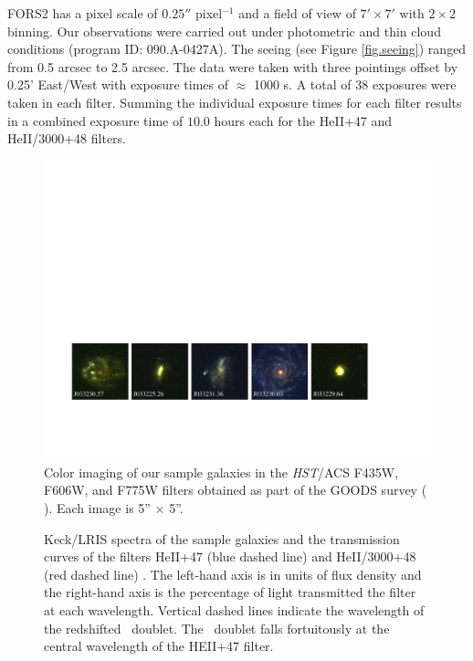 \documentclass[twocolumn]{aastex61}
\begin{document}
FORS2 has a pixel scale of $0.25''$ pixel$^{-1}$ and a field of view of $7'\times7'$ with $2 \times 2$ binning. Our observations were carried out under photometric and thin cloud conditions (program ID: 090.A-0427A). The seeing (see Figure \ref{fig.seeing}) ranged from 0.5 arcsec to 2.5 arcsec. The data were taken with three pointings offset by 0.25' East/West with exposure times of $\approx$ 1000 s. A total of 38  exposures were taken in each filter. Summing the individual exposure times for each filter results in a combined exposure time of $10.0$ hours each for the HeII+47 and HeII/3000+48 filters.

\begin{figure}[!ht]
\centering
\includegraphics[scale=.73]{../Figures/fors2_color_imstamps.pdf}
\caption{Color imaging of our sample galaxies in the \emph{HST}/ACS F435W, F606W, and F775W filters obtained as part of the GOODS survey (\citeauthor{Giavalisco2004} \citeyear{Giavalisco2004}). Each image is 5'' $\times$ 5''.\label{fig:hstims}}
\end{figure}

\begin{figure}[!h]
\centering
{}
\caption{Keck/LRIS spectra of the sample galaxies and the transmission curves of the filters HeII+47 (blue dashed line) and HeII/3000+48 (red dashed line) . The left-hand axis is in units of flux density and the right-hand axis is the percentage of light transmitted the filter at each wavelength. Vertical dashed lines indicate the wavelength of the redshifted \ doublet. The \ doublet falls fortuitously at the central wavelength of the HEII+47 filter.}
\label{fig:spec_images}
\end{figure}
\end{document}
